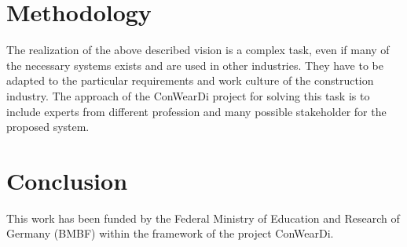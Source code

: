 \section{Methodology}
The realization of the above described vision is a complex task, even if many of the necessary systems exists and are used in other industries. 
They have to be adapted to the particular requirements and work culture of the construction industry. 
The approach of the ConWearDi project for solving this task is to include experts from different profession and many possible stakeholder for the proposed system.



\section{Conclusion}


\begin{acks}
  This work has been funded by the Federal Ministry of Education and Research of Germany (BMBF) within the framework of the project ConWearDi.
\end{acks}
